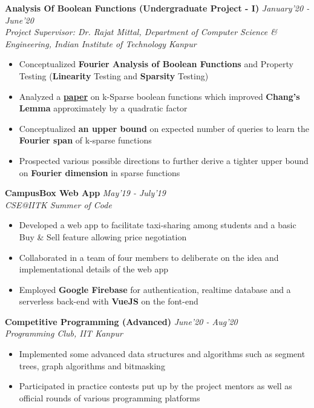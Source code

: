 \documentclass[9pt]{article}
\renewcommand{\labelitemi}{\small$\blacktriangleright$}
\newenvironment{changemargin}[2]{%
  \begin{list}{}{%
    \setlength{\topsep}{2pt}%
    \setlength{\leftmargin}{#1}%
    \setlength{\rightmargin}{#2}%
    \setlength{\listparindent}{\parindent}%
    \setlength{\itemindent}{\parindent}%
    \setlength{\parsep}{\parskip}%
  }%
  \item[]}{\end{list}
}
\newenvironment{body} {
	\vspace*{-16pt}
	\begin{changemargin}{-0.4in}{-0.5in}
  }	
	{\end{changemargin}
}
\begin{document}
\begin{body}
	\vspace{18pt}\leftmargin=-0.7in
	\textbf {Analysis Of Boolean Functions (Undergraduate Project - I)} 
\hfill \emph{January'20 - June'20}\\
\emph{Project Supervisor: Dr. Rajat Mittal, Department of Computer Science \& Engineering, Indian Institute of Technology Kanpur}\\
\vspace{-5pt}
	\begin{itemize} \itemsep -1pt
		\item Conceptualized \textbf{Fourier Analysis of Boolean Functions} and Property Testing (\textbf{Linearity} Testing and \textbf{Sparsity} Testing)
		\item Analyzed a \href{https://arxiv.org/pdf/1810.00481.pdf}{\textbf{paper}} on k-Sparse boolean functions which improved \textbf{Chang's Lemma} approximately by a quadratic factor \item Conceptualized \textbf{an upper bound} on expected number of queries to learn the \textbf{Fourier span} of k-sparse functions
		\item Prospected various possible directions to further derive a tighter upper bound on \textbf{Fourier dimension} in sparse functions
	\end{itemize}
	\vspace{-4pt}
\textbf {CampusBox Web App}  \hfill \emph{May'19 - July'19}\\
\emph{CSE@IITK Summer of Code}
\vspace{-3pt}
	\begin{itemize}
	\itemsep -1pt 
	\item Developed a web app to facilitate taxi-sharing among students and a basic Buy \& Sell feature allowing price negotiation
    \item Collaborated in a team of four members to deliberate on the idea and implementational details of the web app
    \item Employed \textbf{Google Firebase} for authentication, realtime database and a serverless back-end with \textbf{VueJS} on the font-end
	\end{itemize}
	\vspace{-4pt}
    \textbf {Competitive Programming (Advanced)} \hfill \emph{June'20 - Aug'20}\\
\emph{Programming Club, IIT Kanpur}\\
\vspace{-5pt}
	\begin{itemize} \itemsep -1pt
		\item  Implemented some advanced data structures and algorithms such as segment trees, graph algorithms and bitmasking
        \item  Participated in practice contests put up by the project mentors as well as official rounds of various programming platforms
	\end{itemize}
\end{body}
    
\end{document}
